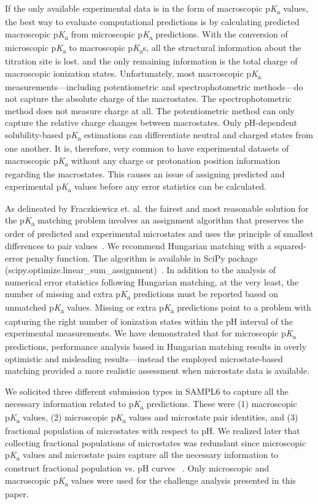 \documentclass[9pt,lineno,final]{elife}
\newcommand{\pKa}{p\textit{K}\textsubscript{a}}
\begin{document}
If the only available experimental data is in the form of macroscopic \pKa{} values, the best way to evaluate computational predictions is by calculating predicted macroscopic \pKa{} from microscopic \pKa{} predictions. 
With the conversion of microscopic \pKa{} to macroscopic \pKa{}s, all the structural information about the titration site is lost. and the only remaining information is the total charge of macroscopic ionization states.
Unfortunately, most macroscopic \pKa{} measurements---including potentiometric and spectrophotometric methods---do not capture the absolute charge of the macrostates. 
The spectrophotometric method does not measure charge at all. 
The potentiometric method can only capture the relative charge changes between macrostates.  
Only pH-dependent solubility-based \pKa{} estimations can differentiate neutral and charged states from one another. 
It is, therefore, very common to have experimental datasets of macroscopic \pKa{} without any charge or protonation position information regarding the macrostates.
This causes an issue of assigning predicted and experimental \pKa{} values before any error statistics can be calculated.

As delineated by Fraczkiewicz et. al. the fairest and most reasonable solution for the \pKa{} matching problem involves an assignment algorithm that preserves the order of predicted and experimental microstates and uses the principle of smallest differences to pair values~\citep{Fraczkiewicz:2013:ReferenceModuleinChemistryMolecularSciencesandChemicalEngineering}. 
We recommend Hungarian matching with a squared-error penalty function. 
The algorithm is available in SciPy package (scipy.optimize.linear\_sum\_assignment)~\citep{SciPy-linear-sum-assignment}.
In addition to the analysis of numerical error statistics following Hungarian matching, at the very least, the number of missing and extra \pKa{} predictions must be reported based on unmatched \pKa{} values. 
Missing or extra \pKa{} predictions point to a problem with capturing the right number of ionization states within the pH interval of the experimental measurements. 
We have demonstrated that for microscopic \pKa{} predictions, performance analysis based in Hungarian matching results in overly optimistic and misleading results---instead the employed microstate-based matching provided a more realistic assessment when microstate data is available. 

We solicited three different submission types in SAMPL6 to capture all the necessary information related to \pKa{} predictions. 
These were (1) macroscopic \pKa{} values, (2) microscopic \pKa{} values and microstate pair identities, and (3) fractional population of microstates with respect to pH. 
We realized later that collecting fractional populations of microstates was redundant since microscopic \pKa{} values and microstate pairs capture all the necessary information to construct fractional population vs. pH curves ~\citep{Gunner:2020:J.Comput.AidedMol.Des.}.  
Only microscopic and macroscopic \pKa{} values were used for the challenge analysis presented in this paper.
\end{document}

